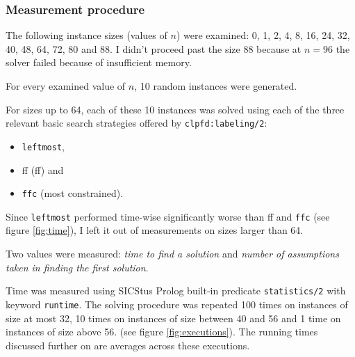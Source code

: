 \documentclass{article}
\newcommand{\code}[1]{\texttt{#1}}
\newcommand{\prolog}{Prolog}
\newcommand{\sicstusprolog}{SICStus \prolog{}}
\begin{document}
\subsubsection{Measurement procedure}
The following instance sizes (values of $n$) were examined:
0, 1, 2, 4, 8, 16, 24, 32, 40, 48, 64, 72, 80 and 88.
I didn't proceed past the size 88
because at $n = 96$ the solver failed because of insufficient memory.

For every examined value of $n$, 10 random instances were generated.

For sizes up to 64,
each of these 10 instances was solved using each of the three relevant basic
search strategies offered by \code{clpfd:labeling/2}:

\begin{itemize}
\item \code{leftmost},
\item \acrshort{ff} (\acrlong{ff}) and
\item \code{ffc} (most constrained).
\end{itemize}

Since \code{leftmost} performed time-wise significantly worse
than \acrshort{ff} and \code{ffc} (see figure \ref{fig:time}),
I left it out of measurements on sizes larger than 64.

Two values were measured: \emph{time to find a solution}
and \emph{number of assumptions taken in finding the first solution}.

Time was measured using \sicstusprolog{} built-in predicate \code{statistics/2}
with keyword \code{runtime}.
The solving procedure was repeated
100 times on instances of size at most 32,
10 times on instances of size between 40 and 56
and 1 time on instances of size above 56.
(see figure \ref{fig:executions}).
The running times discussed further on are averages across these executions.
\end{document}
